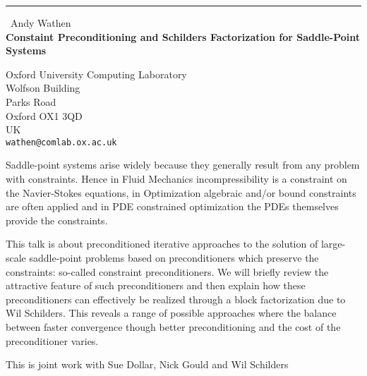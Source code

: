 \documentclass{report}
\begin{document}
\begin{center}
\rule{6in}{1pt} \
{\large Andy Wathen \\
{\bf Constaint Preconditioning and Schilders Factorization for Saddle-Point Systems}}

Oxford University Computing Laboratory \\ Wolfson Building \\ Parks Road \\ Oxford OX1 3QD \\ UK
\\
{\tt wathen@comlab.ox.ac.uk}\end{center}

Saddle-point systems arise widely because they generally result
from any problem with constraints. Hence in Fluid Mechanics
incompressibility is a constraint on the Navier-Stokes equations,
in Optimization algebraic and/or bound constraints are often
applied and in PDE constrained optimization the PDEs themselves
provide the constraints.

This talk is about preconditioned iterative approaches to the
solution of large-scale saddle-point problems based on
preconditioners which preserve the constraints: so-called
constraint preconditioners. We will briefly review the attractive
feature of such preconditioners and then explain how these
preconditioners can effectively be realized through a block
factorization due to Wil Schilders. This reveals a range of
possible approaches where the balance between faster convergence
though better preconditioning and the cost of the preconditioner
varies.


This is joint work with Sue Dollar, Nick Gould and Wil Schilders
\end{document}
